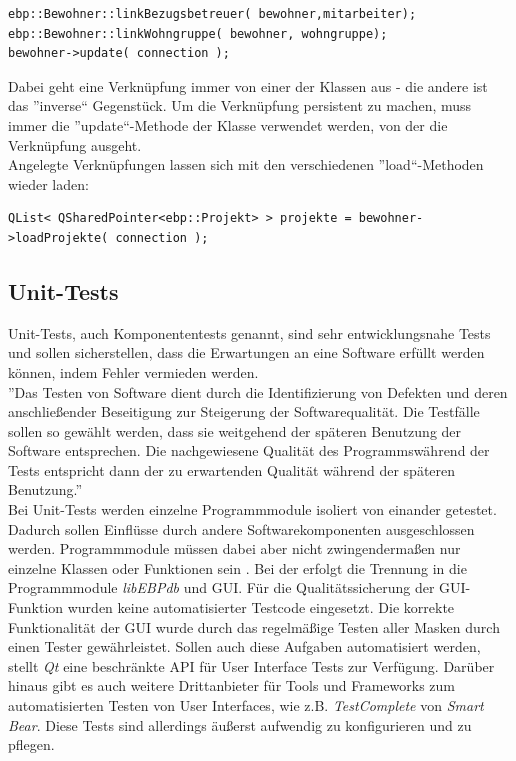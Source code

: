 \begin{lstlisting}
ebp::Bewohner::linkBezugsbetreuer( bewohner,mitarbeiter);
ebp::Bewohner::linkWohngruppe( bewohner, wohngruppe);
bewohner->update( connection );
\end{lstlisting}
Dabei geht eine Verknüpfung immer von einer der Klassen aus - die andere ist das ''inverse`` Gegenstück.
Um die Verknüpfung persistent zu machen, muss immer die ''update``-Methode der Klasse verwendet werden, von der die Verknüpfung ausgeht.\\
Angelegte Verknüpfungen lassen sich mit den verschiedenen ''load``-Methoden wieder laden:\\
\begin{lstlisting}
QList< QSharedPointer<ebp::Projekt> > projekte = bewohner->loadProjekte( connection );
\end{lstlisting}

\newpage

\subsection{Unit-Tests}

Unit-Tests, auch Komponententests genannt, sind sehr entwicklungsnahe Tests und sollen sicherstellen, dass die Erwartungen an eine Software erfüllt
werden können, indem Fehler vermieden werden.\\
''Das Testen von Software dient durch die Identifizierung von Defekten und deren anschließender Beseitigung zur Steigerung der Softwarequalität. Die 
Testfälle sollen so gewählt werden, dass sie weitgehend der späteren Benutzung der Software entsprechen. Die nachgewiesene Qualität des
Programmswährend der Tests entspricht dann der zu erwartenden Qualität während der späteren Benutzung\cite[S. 11]{Softwaretests}.''\\

Bei Unit-Tests werden einzelne Programmmodule isoliert von einander getestet. Dadurch sollen Einflüsse durch andere Softwarekomponenten ausgeschlossen
werden. Programmmodule müssen dabei aber nicht zwingendermaßen nur einzelne Klassen oder Funktionen sein \cite[Vgl. S. 11]{Softwaretests}. Bei der
\EBP erfolgt die Trennung in die Programmmodule \textit{libEBPdb} und GUI. Für die Qualitätssicherung der GUI-Funktion wurden keine automatisierter Testcode
eingesetzt. Die korrekte Funktionalität der GUI wurde durch das regelmäßige Testen aller Masken durch einen Tester gewährleistet. Sollen auch diese
Aufgaben automatisiert werden, stellt \textit{Qt} eine beschränkte API für User Interface Tests zur Verfügung. Darüber hinaus gibt es auch weitere
Drittanbieter für Tools und Frameworks zum automatisierten Testen von User Interfaces, wie z.B. \textit{TestComplete} von \textit{Smart Bear}. Diese Tests sind
allerdings äußerst aufwendig zu konfigurieren und zu pflegen.\\

